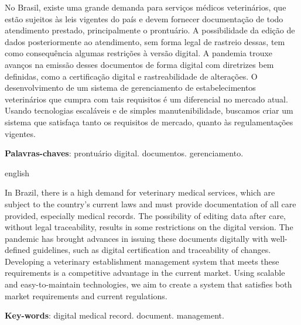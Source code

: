 \documentclass[
    12pt,               %
    openright,          %
    oneside,
    a4paper,            %
    BIBLATEX,           %
    TODO,               %
    english,            %
    brazil              %
    ]{ifsp-spo-inf-ctds}
\begin{document}
 
\frenchspacing 

\pretextual

\imprimircapa
\imprimirfolhaderosto






\setlength{\absparsep}{18pt} %
\begin{resumo}

No Brasil, existe uma grande demanda para serviços médicos veterinários, que estão sujeitos às leis vigentes do país e devem fornecer documentação de todo atendimento prestado, principalmente o prontuário. A possibilidade da edição de dados posteriormente ao atendimento, sem forma legal de rastreio dessas, tem como consequência algumas restrições à versão digital. A pandemia trouxe avanços na emissão desses documentos de forma digital com diretrizes bem definidas, como a certificação digital e rastreabilidade de alterações. O desenvolvimento de um sistema de gerenciamento de estabelecimentos veterinários que cumpra com tais requisitos é um diferencial no mercado atual. Usando tecnologias escaláveis e de simples manutenibilidade, buscamos criar um sistema que satisfaça tanto os requisitos de mercado, quanto às regulamentações vigentes. 

\textbf{Palavras-chaves}: prontuário digital. documentos. gerenciamento.
\end{resumo}

\begin{resumo}[Abstract]
 \begin{otherlanguage*}{english}
 
 In Brazil, there is a high demand for veterinary medical services, which are subject to the country's current laws and must provide documentation of all care provided, especially medical records. The possibility of editing data after care, without legal traceability, results in some restrictions on the digital version. The pandemic has brought advances in issuing these documents digitally with well-defined guidelines, such as digital certification and traceability of changes. Developing a veterinary establishment management system that meets these requirements is a competitive advantage in the current market. Using scalable and easy-to-maintain technologies, we aim to create a system that satisfies both market requirements and current regulations.
 	
   \vspace{\onelineskip}
 
   \noindent 
   \textbf{Key-words}: digital medical record. document. management. 
 \end{otherlanguage*}
\end{resumo}
\end{document}

